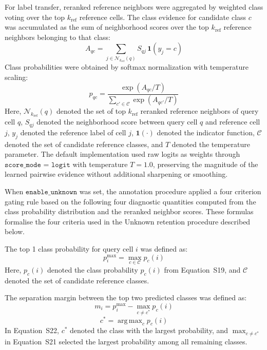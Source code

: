\documentclass[11pt]{article}
\begin{document}
For label transfer, reranked reference neighbors were aggregated by weighted class voting over the top \(k_{\mathrm{ref}}\) reference cells. The class evidence for candidate class \(c\) was accumulated as the sum of neighborhood scores over the top \(k_{\mathrm{ref}}\) reference neighbors belonging to that class:
\begin{equation}
A_{qc} = \sum_{j \in \mathcal{N}_{k_{\mathrm{ref}}}(q)} S_{qj} \, \boldsymbol{1}(y_j = c)
\label{eq:supp_class_evidence}
\end{equation}
Class probabilities were obtained by softmax normalization with temperature scaling:
\begin{equation}
p_{qc} = \frac{\exp(A_{qc} / T)}{\sum_{c' \in \mathcal{C}} \exp(A_{qc'} / T)}
\label{eq:supp_class_prob}
\end{equation}
Here, \(\mathcal{N}_{k_{\mathrm{ref}}}(q)\) denoted the set of top \(k_{\mathrm{ref}}\) reranked reference neighbors of query cell \(q\), \(S_{qj}\) denoted the neighborhood score between query cell \(q\) and reference cell \(j\), \(y_j\) denoted the reference label of cell \(j\), \(\boldsymbol{1}(\cdot)\) denoted the indicator function, \(\mathcal{C}\) denoted the set of candidate reference classes, and \(T\) denoted the temperature parameter. The default implementation used raw logits as weights through \(\texttt{score\_mode = logit}\) with temperature \(T=1.0\), preserving the magnitude of the learned pairwise evidence without additional sharpening or smoothing.

When \(\texttt{enable\_unknown}\) was set, the annotation procedure applied a four criterion gating rule based on the following four diagnostic quantities computed from the class probability distribution and the reranked neighbor scores. These formulas formalise the four criteria used in the Unknown retention procedure described below.

The top 1 class probability for query cell \(i\) was defined as:
\begin{equation}
p_i^{\max} = \max_{c \in \mathcal{C}} p_c(i)
\label{eq:supp_top1prob}
\end{equation}
Here, \(p_c(i)\) denoted the class probability \(p_c(i)\) from Equation~S19, and \(\mathcal{C}\) denoted the set of candidate reference classes.

The separation margin between the top two predicted classes was defined as:
\begin{equation}
m_i = p_i^{\max} - \max_{c \neq c^*} p_c(i)
\label{eq:supp_margin}
\end{equation}
\begin{equation}
c^* = \operatorname{arg\,max}_{c} p_c(i)
\label{eq:supp_bestclass}
\end{equation}
In Equation~S22, \(c^*\) denoted the class with the largest probability, and \(\max_{c \neq c^*}\) in Equation~S21 selected the largest probability among all remaining classes.
\end{document}
